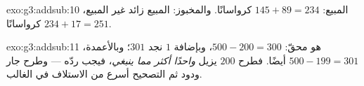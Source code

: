 \begin{solution}{exo:g3:addsub:10}
المبيع: $145 + 89 = 234$ كرواسانًا. والمخبوز: المبيع زائد غير
المبيع، $234 + 17 = 251$ كرواسانًا.
\end{solution}

\begin{solution}{exo:g3:addsub:11}
هو محقّ: $500 - 200 = 300$، وبإضافة $1$ نجد $301$؛ وبالأعمدة،
$500 - 199 = 301$ أيضًا. فطرح $200$ يزيل \emph{واحدًا أكثر مما
ينبغي}، فيجب ردّه --- وطرح جار ودود ثم التصحيح أسرع من الاستلاف
في الغالب.
\end{solution}
